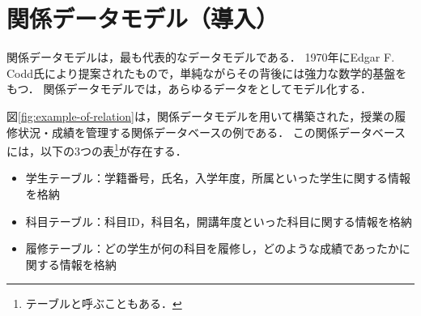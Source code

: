 \section{関係データモデル（導入）}
関係データモデルは，最も代表的なデータモデルである．
1970年にEdgar F. Codd氏により提案されたもので，単純ながらその背後には強力な数学的基盤をもつ\cite{Codd1970}．
関係データモデルでは，あらゆるデータをとしてモデル化する．

図\ref{fig:example-of-relation}は，関係データモデルを用いて構築された，授業の履修状況・成績を管理する関係データベースの例である．
この関係データベースには，以下の3つの表\footnote{テーブルと呼ぶこともある．}が存在する．
\begin{itemize}
\item 学生テーブル：学籍番号，氏名，入学年度，所属といった学生に関する情報を格納
\item 科目テーブル：科目ID，科目名，開講年度といった科目に関する情報を格納
\item 履修テーブル：どの学生が何の科目を履修し，どのような成績であったかに関する情報を格納
\end{itemize}


